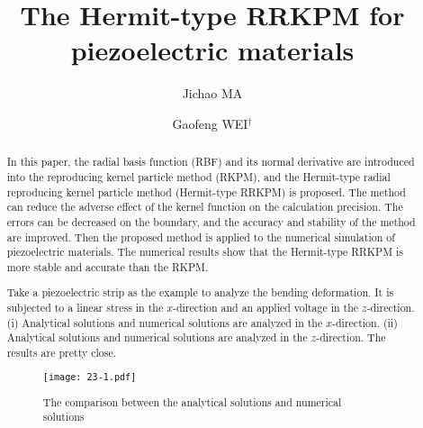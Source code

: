 \documentclass[10pt]{article}
\title{The Hermit-type RRKPM for piezoelectric materials}
\date{}
\author[$\relax$]{Jichao MA}
\author[$\relax$]{Gaofeng WEI$^\dagger$}
\affil[$\relax$]{Qilu University of Technology, China}
\affil[$\relax$]{\email{\dagger}{wgf@spu.edu.cn}}
\begin{document}
\maketitle


\begin{abstract}
In this paper, the radial basis function (RBF) and its normal derivative are introduced into the reproducing kernel particle method (RKPM), and the Hermit-type radial reproducing kernel particle method (Hermit-type RRKPM) is proposed. The method can reduce the adverse effect of the kernel function on the calculation precision. The errors can be decreased on the boundary, and the accuracy and stability of the method are improved. Then the proposed method is applied to the numerical simulation of piezoelectric materials. The numerical results show that the Hermit-type RRKPM is more stable and accurate than the RKPM.

Take a piezoelectric strip as the example to analyze the bending deformation. It is subjected to a linear stress in the $x$-direction and an applied voltage in the $z$-direction. (i) Analytical solutions and numerical solutions are analyzed in the $x$-direction. (ii) Analytical solutions and numerical solutions are analyzed in the $z$-direction. The results are pretty close.


\begin{figure}[!htb]
\centering
\texttt{[image: 23-1.pdf]}
\caption{The comparison between the analytical solutions and numerical solutions}\label{fig:23}
\end{figure}

\end{abstract}



\addbib
\end{document}
